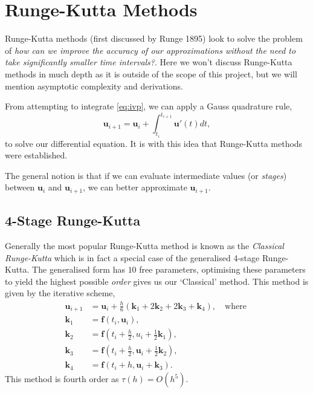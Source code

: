 \documentclass[12pt, twoside]{report}
\theoremstyle{plain}
\theoremstyle{definition}
\theoremstyle{definition}
\begin{document}
    \section{Runge-Kutta Methods}
    \label{2_runge_kutta}
        Runge-Kutta methods (first discussed by Runge 1895) look to solve the 
        problem of \textit{how can we improve the accuracy of our 
        approximations without the need to take significantly smaller time 
        intervals?}. Here we won't discuss Runge-Kutta methods in much depth 
        as it is outside of the scope of this project, but we will mention 
        asymptotic complexity and derivations.

        From attempting to integrate \eqref{eq:ivp}, we can apply a Gauss quadrature rule,
        \begin{equation}
        \label{eq:fundamental_theorem_calculus}
            \mathbf{u}_{i+1} = \mathbf{u}_i + \int_{t_i}^{t_{i+1}} 
            \mathbf{u}'(t) dt,
        \end{equation}
        to solve our differential equation. It is with this idea that Runge-Kutta methods were established.

        The general notion is that if we can evaluate intermediate values 
        (or \textit{stages}) between $\mathbf{u}_i$ and $\mathbf{u}_{i+1}$, we can better approximate $\mathbf{u}_{i+1}$. 

        \subsection{4-Stage Runge-Kutta}
        \label{2_rk4}
            Generally the most popular Runge-Kutta method is known as the 
            \textit{Classical Runge-Kutta} which is in fact a special case of 
            the generalised 4-stage Runge-Kutta. The generalised form has $10$
            free parameters, optimising these parameters to yield the highest 
            possible \textit{order} gives us our `Classical' method. This 
            method is given by the iterative scheme,
            \begin{equation}
            \label{eq:rk4}
                \begin{split}
                    \mathbf{u}_{i+1} &= \mathbf{u}_i + 
                    \frac{h}{6} (\mathbf{k}_1 + 2\mathbf{k}_2 + 2\mathbf{k}_3 
                    + \mathbf{k}_4), \quad 
                    \text{where }\\
                    \mathbf{k}_1 &= \mathbf{f}(t_i, \mathbf{u}_i),\\
                    \mathbf{k}_2 &= \mathbf{f}(t_i+\frac{h}{2}, 
                    u_i+\frac{1}{2}\mathbf{k}_1),\\
                    \mathbf{k}_3 &= \mathbf{f}(t_i+\frac{h}{2}, 
                    \mathbf{u}_i+\frac{1}{2}\mathbf{k}_2),\\
                    \mathbf{k}_4 &= \mathbf{f}(t_i+h, 
                    \mathbf{u}_i+\mathbf{k}_3).
                \end{split}
            \end{equation}
            This method is fourth order as $\tau(h)=O(h^5)$. 
\end{document}
